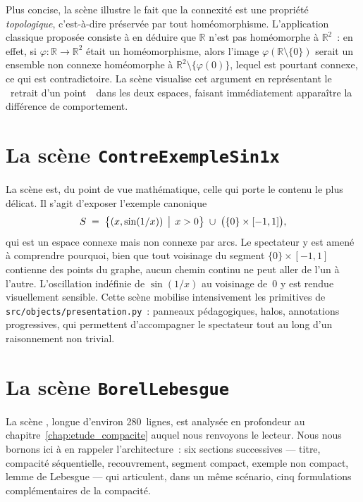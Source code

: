 \documentclass[12pt, a4paper, openany]{report}
\begin{document}
	Plus concise, la scène  illustre le fait que la connexité est une propriété \emph{topologique}, c’est-à-dire préservée par tout homéomorphisme. L’application classique proposée consiste à en déduire que $\mathbb{R}$ n’est pas homéomorphe à $\mathbb{R}^2$~: en effet, si $\varphi:\mathbb{R}\to\mathbb{R}^2$ était un homéomorphisme, alors l’image $\varphi(\mathbb{R}\setminus\{0\})$ serait un ensemble non connexe homéomorphe à $\mathbb{R}^2\setminus\{\varphi(0)\}$, lequel est pourtant connexe, ce qui est contradictoire. La scène visualise cet argument en représentant le \og~retrait d’un point~\fg\ dans les deux espaces, faisant immédiatement apparaître la différence de comportement.

	\section{La scène \texttt{ContreExempleSin1x}}

	La scène  est, du point de vue mathématique, celle qui porte le contenu le plus délicat. Il s’agit d’exposer l’exemple canonique
	\[
		S \;=\; \bigl\{(x,\sin(1/x))\,\bigm|\,x>0\bigr\}\;\cup\;\bigl(\{0\}\times[-1,1]\bigr),
	\]
	qui est un espace connexe mais non connexe par arcs. Le spectateur y est amené à comprendre pourquoi, bien que tout voisinage du segment $\{0\}\times[-1,1]$ contienne des points du graphe, aucun chemin continu ne peut aller de l’un à l’autre. L’oscillation indéfinie de $\sin(1/x)$ au voisinage de~$0$ y est rendue visuellement sensible. Cette scène mobilise intensivement les primitives de \texttt{src/objects/presentation.py}~: panneaux pédagogiques, halos, annotations progressives, qui permettent d’accompagner le spectateur tout au long d’un raisonnement non trivial.

	\section{La scène \texttt{BorelLebesgue}}

	La scène , longue d’environ 280~lignes, est analysée en profondeur au chapitre~\ref{chap:etude_compacite} auquel nous renvoyons le lecteur. Nous nous bornons ici à en rappeler l’architecture~: six sections successives — titre, compacité séquentielle, recouvrement, segment compact, exemple non compact, lemme de Lebesgue — qui articulent, dans un même scénario, cinq formulations complémentaires de la compacité.
\end{document}
